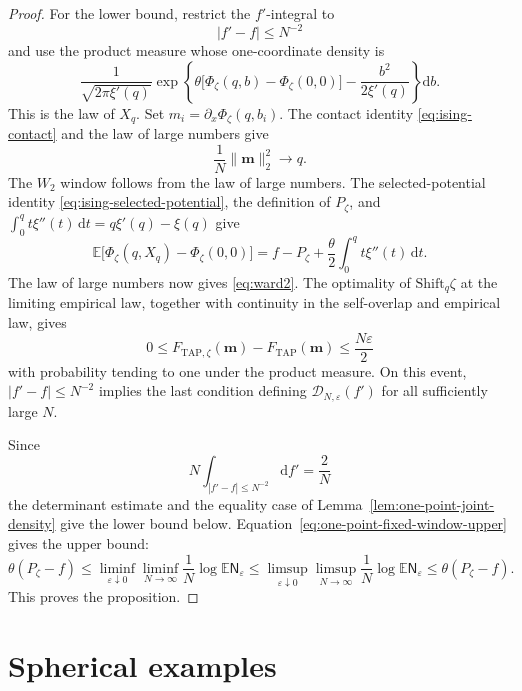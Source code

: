 \documentclass[a4paper,10pt,reqno]{amsart}
\numberwithin{equation}{section}
\newcommand{\ve}{\varepsilon}
\newcommand{\dE}{\mathbb{E}}%
\newcommand{\dd}{\mathrm{d}}
\newcommand{\TAP}{\mathrm{TAP}}
\newcommand{\bfm}{\mathbf{m}}
\newcommand{\Shift}{\mathrm{Shift}}%
\begin{document}
\begin{proof}
		For the lower bound, restrict the \(f'\)-integral to
		\[
		|f'-f|\le N^{-2}
		\]
		and use the product measure whose one-coordinate density is
		\[
		\frac1{\sqrt{2\pi\xi'(q)}}
		\exp\left\{
		\theta\bigl[\Phi_\zeta(q,b)-\Phi_\zeta(0,0)\bigr]
		-\frac{b^2}{2\xi'(q)}
		\right\}\dd b.
		\]
		This is the law of \(X_q\). Set
		\(m_i=\partial_x\Phi_\zeta(q,b_i)\). The contact identity
		\eqref{eq:ising-contact} and the law of large numbers give
		\[
		\frac1N\|\bfm\|_2^2\longrightarrow q.
		\]
		The \(W_2\) window follows from the law of large numbers.
		The selected-potential identity
		\eqref{eq:ising-selected-potential}, the definition of \(P_\zeta\),
		and
		\(\int_0^q t\xi''(t)\,\dd t=q\xi'(q)-\xi(q)\) give
		\[
		\dE\bigl[
		\Phi_\zeta(q,X_q)-\Phi_\zeta(0,0)
		\bigr]
		=
		f-P_\zeta
		+\frac\theta2\int_0^q t\xi''(t)\,\dd t.
		\]
		The law of large numbers now gives \eqref{eq:ward2}. The optimality of
		\(\Shift_q\zeta\) at the limiting
		empirical law, together with continuity in the self-overlap and
		empirical law, gives
		\[
		0\le
		F_{\TAP,\zeta}(\bfm)-F_{\TAP}(\bfm)
		\le \frac{N\ve}{2}
		\]
		with probability tending to one under the product measure. On this event,
		\(|f'-f|\le N^{-2}\) implies the last condition defining
		\(\mathcal D_{N,\ve}(f')\) for all sufficiently large \(N\).
		
		Since
		\[
		N\int_{|f'-f|\le N^{-2}}\dd f'=\frac2N
		\]
		the determinant estimate and the equality case of
		Lemma~\ref{lem:one-point-joint-density} give the lower bound below.
		Equation~\eqref{eq:one-point-fixed-window-upper} gives the upper bound:
		\[
		\theta(P_\zeta-f)
		\le
		\liminf_{\ve\downarrow0}
		\liminf_{N\to\infty}
		\frac1N\log
		\dE\mathsf N_\ve
		\le
		\limsup_{\ve\downarrow0}
		\limsup_{N\to\infty}
		\frac1N\log
		\dE\mathsf N_\ve
		\le
		\theta(P_\zeta-f).
		\]
		This proves the proposition.
	\end{proof}
	
	\section{Spherical examples}
	\label{sec:spherical-examples}
	
\end{document}
